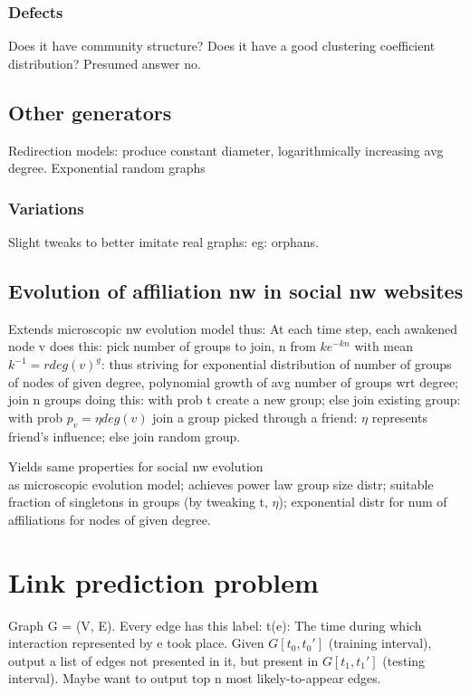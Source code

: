 \documentclass[oneside, article]{memoir}
\begin{document}
\subsection{Defects}
Does it have community structure? Does it have a good clustering coefficient distribution? Presumed answer no.

\section{Other generators}
Redirection models: produce constant diameter, logarithmically increasing avg degree. Exponential random graphs

\subsection{Variations}
Slight tweaks to better imitate real graphs: eg: orphans.

\section{Evolution of affiliation nw in social nw websites}
Extends microscopic nw evolution model thus: At each time step, each awakened node v does this: pick number of groups to join, n from $ke^{-kn}$ with mean $k^{-1} = r deg(v)^{g}$: thus striving for exponential distribution of number of groups of nodes of given degree, polynomial growth of avg number of groups wrt degree; join n groups doing this: with prob t create a new group; else join existing group: with prob $p_{v} = \eta deg(v)$ join a group picked through a friend: $\eta$ represents friend's influence; else join random group.

Yields same properties for social nw evolution\\
 as microscopic evolution model; achieves power law group size distr; suitable fraction of singletons in groups (by tweaking t, $\eta$); exponential distr for num of affiliations for nodes of given degree.

\chapter{Link prediction problem}
Graph G = (V, E). Every edge has this label: t(e): The time during which interaction represented by e took place. Given $G[t_{0}, t_{0}']$ (training interval), output a list of edges not presented in it, but present in $G[t_{1}, t_{1}']$ (testing interval). Maybe want to output top n most likely-to-appear edges.
\end{document}
